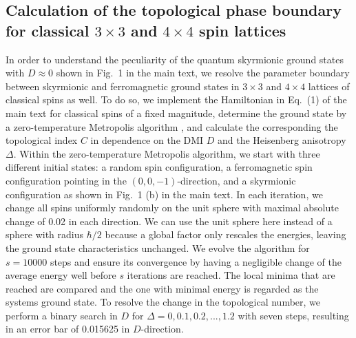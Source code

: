 \documentclass[reprint,aps,prb,superscriptaddress,10pt]{revtex4-2} %
\begin{document}
\subsection{\texorpdfstring{Calculation of the topological phase boundary for classical $3\times 3$ and $4\times 4$ spin lattices}{Calculation of the topological phase boundary}}
In order to understand the peculiarity of the quantum skyrmionic ground states with $D \approx 0$ shown in Fig.~1 in the main text, we resolve the parameter boundary between skyrmionic and ferromagnetic ground states in $3 \times 3$ and $4 \times 4$ lattices of classical spins as well. To do so, we implement the Hamiltonian in Eq.~(1) of the main text for classical spins of a fixed magnitude, determine the ground state by a zero-temperature Metropolis algorithm \cite{Metropolis1953}, and calculate the corresponding the topological index $C$ in dependence on the DMI $D$ and the Heisenberg anisotropy $\Delta$. Within the zero-temperature Metropolis algorithm, we start with three different initial states: a random spin configuration, a ferromagnetic spin configuration pointing in the $(0,0,-1)$-direction, and a skyrmionic configuration as shown in Fig.~1 (b) in the main text. In each iteration, we change all spins uniformly randomly on the unit sphere with maximal absolute change of 0.02 in each direction. We can use the unit sphere here instead of a sphere with radius $\hbar/2$ because a global factor only rescales the energies, leaving the ground state characteristics unchanged. We evolve the algorithm for $s=10000$ steps and ensure its convergence by having a negligible change of the average energy well before $s$ iterations are reached. The local minima that are reached are compared and the one with minimal energy is regarded as the systems ground state. To resolve the change in the topological number, we perform a binary search in $D$ for $\Delta = 0,0.1,0.2,...,1.2$ with seven steps, resulting in an error bar of 0.015625 in $D$-direction.
\end{document}
